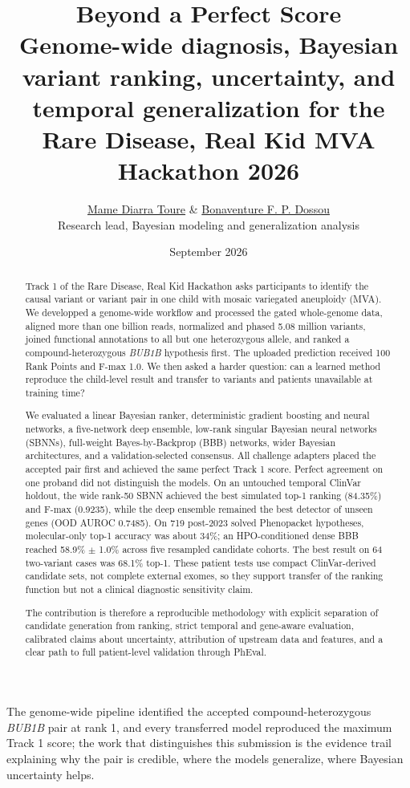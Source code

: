 \documentclass[11pt]{article}
\title{\textbf{Beyond a Perfect Score}\\[0.35em]
\large Genome-wide diagnosis, Bayesian variant ranking, uncertainty, and temporal generalization for the Rare Disease, Real Kid MVA Hackathon 2026}
\author{\href{https://arradiat.github.io}{Mame Diarra Toure} \& \href{https://bonaventuredossou.github.io}{Bonaventure F. P. Dossou}\\[0.3em]\small Research lead, Bayesian modeling and generalization analysis}
\date{ September 2026}
\begin{document}
\maketitle

\begin{tcolorbox}[colback=light,colframe=navy,title=TL;DR]
The genome-wide pipeline identified the accepted compound-heterozygous \textit{BUB1B} pair at rank 1, and every transferred model reproduced the maximum Track 1 score; the work that distinguishes this submission is the evidence trail explaining why the pair is credible, where the models generalize, where Bayesian uncertainty helps.
\end{tcolorbox}

\begin{abstract}
Track 1 of the Rare Disease, Real Kid Hackathon asks participants to identify the causal variant or variant pair in one child with mosaic variegated aneuploidy (MVA). We developped a genome-wide workflow and processed the gated whole-genome data, aligned more than one billion reads, normalized and phased 5.08 million variants, joined functional annotations to all but one heterozygous allele, and ranked a compound-heterozygous \textit{BUB1B} hypothesis first. The uploaded prediction received 100 Rank Points and F-max 1.0. We then asked a harder question: can a learned method reproduce the child-level result and transfer to variants and patients unavailable at training time?

We evaluated a linear Bayesian ranker, deterministic gradient boosting and neural networks, a five-network deep ensemble, low-rank singular Bayesian neural networks (SBNNs), full-weight Bayes-by-Backprop (BBB) networks, wider Bayesian architectures, and a validation-selected consensus. All challenge adapters placed the accepted pair first and achieved the same perfect Track 1 score. Perfect agreement on one proband did not distinguish the models. On an untouched temporal ClinVar holdout, the wide rank-50 SBNN achieved the best simulated top-1 ranking (84.35\%) and F-max (0.9235), while the deep ensemble remained the best detector of unseen genes (OOD AUROC 0.7485). On 719 post-2023 solved Phenopacket hypotheses, molecular-only top-1 accuracy was about 34\%; an HPO-conditioned dense BBB reached 58.9\% $\pm$ 1.0\% across five resampled candidate cohorts. The best result on 64 two-variant cases was 68.1\% top-1. These patient tests use compact ClinVar-derived candidate sets, not complete external exomes, so they support transfer of the ranking function but not a clinical diagnostic sensitivity claim.

The contribution is therefore a reproducible methodology with explicit separation of candidate generation from ranking, strict temporal and gene-aware evaluation, calibrated claims about uncertainty, attribution of upstream data and features, and a clear path to full patient-level validation through PhEval.
\end{abstract}
\end{document}
